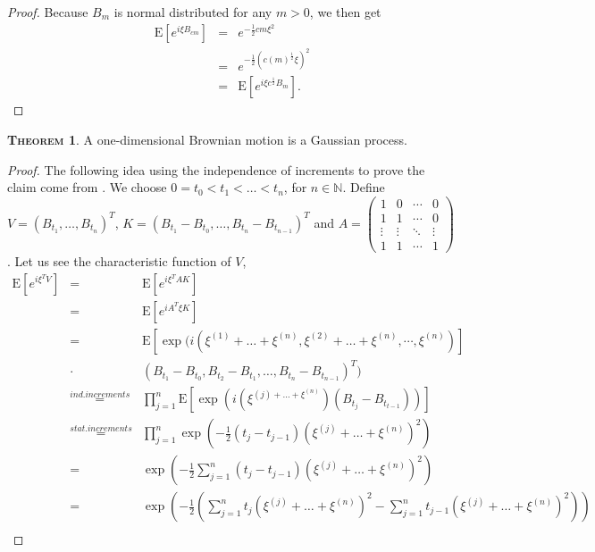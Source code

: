 \documentclass[a4paper, twoside, 11pt]{article}
\theoremstyle{definition}
\newtheorem{theorem}[definition]{\scshape Theorem}
\begin{document}
\begin{proof}
  Because $B_m$ is normal distributed for any $m > 0$, we then get
  \begin{eqnarray*}
	\mathrm{E} [e^{i\xi B_{cm}}] &=& e^{-\frac{1}{2}cm\xi^2}\\
	&=& e^{-\frac{1}{2}(c(m)^{\frac{1}{2}}\xi)^2}\\
	&=& \mathrm{E} [e^{i\xi c^{\frac{1}{2}}B_m}] .
  \end{eqnarray*}
\end{proof}

\begin{theorem}
  A one-dimensional Brownian motion is a Gaussian process.
\end{theorem}

\begin{proof}
  The following idea using the independence of increments to prove the claim come from \cite{shilling}.
  We choose $0=t_0<t_1<\dots<t_n$, for $n \in \mathbb{N}$. Define
  $V = (B_{t_1},\dots,B_{t_n})^T$,  $K = (B_{t_1}-B_{t_0},\dots, B_{t_n}-B_{t_{n-1}})^T$ and 
  $A = 
  \begin{pmatrix}
	1      & 0      & \cdots & 0\\
	1      & 1      & \cdots & 0\\
	\vdots & \vdots & \ddots & \vdots \\
	1      & 1      & \cdots & 1
  \end{pmatrix}
	$.
  Let us see the characteristic function of $V$,
  \begin{eqnarray*}
	\mathrm{E} [e^{i\xi^T V}] &=& \mathrm{E} [e^{i\xi^T AK}]\\ 
	&=& \mathrm{E} [e^{iA^T\xi K}]\\
	&=& \mathrm{E} [\exp(i (\xi^{(1)}+\dots+\xi^{(n)}, \xi^{(2)}+\dots+\xi^{(n)}, \cdots,\xi^{(n)})] \\
	&\cdot& (B_{t_1}-B_{t_0}, B_{t_2}-B_{t_1},\dots,B_{t_n}-B_{t_{n-1}})^T)\\
	&\overset{ind.increments}{=}& \prod_{j=1}^n \mathrm{E} [\exp(i(\xi^{(j)+\dots+\xi^{(n)}})(B_{t_j}-B_{t_{t-1}}))]\\
	&\overset{stat.increments}{=}& \prod_{j=1}^n \exp(-\frac{1}{2}(t_j - t_{j-1})(\xi^{(j)}+\dots+\xi^{(n)})^2) \\
	&=& \exp\left(-\frac{1}{2}\sum_{j=1}^n (t_j - t_{j-1})(\xi^{(j)}+\dots+\xi^{(n)})^2\right)\\
    &=& \exp\left(-\frac{1}{2}\left(\sum_{j=1}^n t_j(\xi^{(j)}+\dots+\xi^{(n)})^2 - \sum_{j=1}^n t_{j-1}(\xi^{(j)}+\dots+\xi^{(n)})^2\right)\right)\\

\end{eqnarray*}
\end{proof}
\end{document}
